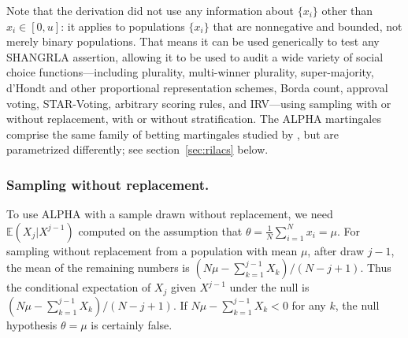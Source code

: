 \documentclass[12pt,runningheads]{llncs}
\newcommand{\EE}{\mathbb{E}}
\begin{document}
{Note that the derivation did not use any information about $\{x_i\}$ other than $x_i \in [0, u]$:
it applies to populations $\{x_i\}$ that are nonnegative and bounded, not merely binary populations.
That means it can be used generically to test any SHANGRLA assertion, allowing it to be used to audit
a wide variety of social choice functions---including plurality, multi-winner plurality, super-majority, d'Hondt and other
proportional representation schemes, Borda count, approval voting, STAR-Voting, arbitrary scoring rules, and 
IRV---using sampling with or without replacement, with or without stratification.
The ALPHA martingales comprise the same family of betting martingales studied by 
\cite{waudby-smithRamdas21,waudby-smithEtal21}, but are parametrized
differently; see section~\ref{sec:rilacs} below.

\subsubsection{Sampling without replacement.}
To use ALPHA with a sample drawn without replacement, we need $\EE(X_j | X^{j-1})$ computed on the assumption that
$\theta =  \frac{1}{N} \sum_{i=1}^N x_i = \mu$.
For sampling without replacement from a population with mean $\mu$, after draw $j-1$, the mean of the remaining numbers is $(N\mu - \sum_{k=1}^{j-1}X_k)/(N-j+1)$.
Thus the conditional expectation of $X_j$ given $X^{j-1}$ under the null is $(N\mu - \sum_{k=1}^{j-1}X_k)/(N-j+1)$.
If $N\mu - \sum_{k=1}^{j-1}X_k < 0$ for any $k$, the null hypothesis $\theta = \mu$ is certainly false.

}
\end{document}
